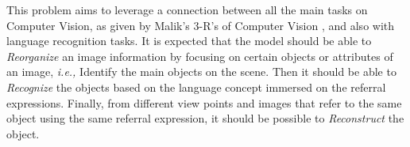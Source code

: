 This problem aims to leverage a connection between all the main tasks on Computer Vision, as given by Malik's 3-R's of Computer Vision \cite{malik2016three}, and also with language recognition tasks. It is expected that the model should be able to \emph{Reorganize} an image information by focusing on certain objects or attributes of an image, \textit{i.e.,} Identify the main objects on the scene. Then it should be able to \emph{Recognize} the objects based on the language concept immersed on the referral expressions. Finally, from different view points and images that refer to the same object using the same referral expression, it should be possible to \emph{Reconstruct} the object.
